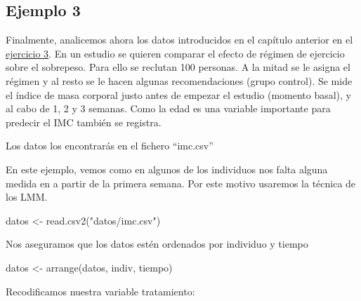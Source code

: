 \documentclass[
]{book}
\newenvironment{Shaded}{\begin{snugshade}}{\end{snugshade}}
\newcommand{\DecValTok}[1]{\textcolor[rgb]{0.00,0.00,0.81}{#1}}
\newcommand{\FunctionTok}[1]{\textcolor[rgb]{0.00,0.00,0.00}{#1}}
\newcommand{\NormalTok}[1]{#1}
\newcommand{\OtherTok}[1]{\textcolor[rgb]{0.56,0.35,0.01}{#1}}
\newcommand{\SpecialCharTok}[1]{\textcolor[rgb]{0.00,0.00,0.00}{#1}}
\newcommand{\StringTok}[1]{\textcolor[rgb]{0.31,0.60,0.02}{#1}}
\begin{document}
\hypertarget{ejemplo-3}{%
\subsection{Ejemplo 3}\label{ejemplo-3}}

Finalmente, analicemos ahora los datos introducidos en el capítulo anterior en el \protect\hyperlink{Ejercicio3}{ejercicio 3}. En un estudio se quieren comparar el efecto de régimen de ejercicio sobre el sobrepeso. Para ello se reclutan 100 personas. A la mitad se le asigna el régimen y al resto se le hacen algunas recomendaciones (grupo control). Se mide el índice de masa corporal justo antes de empezar el estudio (momento basal), y al cabo de 1, 2 y 3 semanas. Como la edad es una variable importante para predecir el IMC también se registra.

Los datos los encontrarás en el fichero ``imc.csv''

En este ejemplo, vemos como en algunos de los individuos nos falta alguna medida en a partir de la primera semana. Por este motivo usaremos la técnica de los LMM.

\begin{Shaded}
\begin{Highlighting}[]
\NormalTok{datos }\OtherTok{\textless{}{-}} \FunctionTok{read.csv2}\NormalTok{(}\StringTok{"datos/imc.csv"}\NormalTok{)}
\end{Highlighting}
\end{Shaded}

Nos aseguramos que los datos estén ordenados por individuo y tiempo

\begin{Shaded}
\begin{Highlighting}[]
\NormalTok{datos }\OtherTok{\textless{}{-}} \FunctionTok{arrange}\NormalTok{(datos, indiv, tiempo)}
\end{Highlighting}
\end{Shaded}

Recodificamos nuestra variable tratamiento:

\begin{Shaded}
\end{Shaded}
\end{document}
